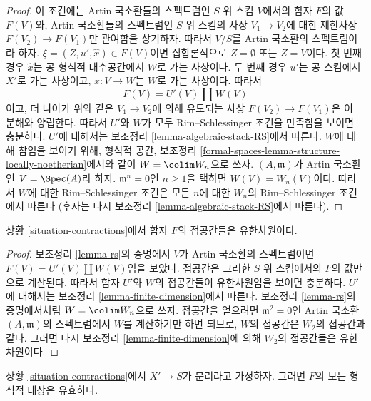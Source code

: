 \begin{proof}
이 조건에는 Artin 국소환들의 스펙트럼인 $S$ 위 스킴 $V$에서의
함자 $F$의 값 $F(V)$와, Artin 국소환들의 스펙트럼인 $S$ 위 스킴의
사상 $V_1 \to V_2$에 대한 제한사상 $F(V_2) \to F(V_1)$만 관여함을
상기하자. 따라서 $V/S$를 Artin 국소환의 스펙트럼이라 하자.
$\xi = (Z, u', \hat x) \in F(V)$이면 집합론적으로
$Z = \emptyset$ 또는 $Z = V$이다. 첫 번째 경우 $\hat x$는
공 형식적 대수공간에서 $W$로 가는 사상이다.
두 번째 경우 $u'$는 공 스킴에서 $X'$로 가는 사상이고,
$\hat x : V \to W$는 $W$로 가는 사상이다. 따라서
$$
F(V) = U'(V) \amalg W(V)
$$
이고, 더 나아가 위와 같은 $V_1 \to V_2$에 의해 유도되는 사상
$F(V_2) \to F(V_1)$은 이 분해와 양립한다.
따라서 $U'$와 $W$가 모두 Rim--Schlessinger 조건을 만족함을 보이면 충분하다.
$U'$에 대해서는 보조정리 \ref{lemma-algebraic-stack-RS}에서 따른다.
$W$에 대해 참임을 보이기 위해, 형식적 공간, 보조정리
\ref{formal-spaces-lemma-structure-locally-noetherian}에서와 같이
$W = \colim W_n$으로 쓰자.
$(A, \mathfrak m)$가 Artin 국소환인 $V = \Spec(A)$라 하자.
$\mathfrak m^n = 0$인 $n \geq 1$을 택하면 $W(V) = W_n(V)$이다.
따라서 $W$에 대한 Rim--Schlessinger 조건은 모든 $n$에 대한
$W_n$의 Rim--Schlessinger 조건에서 따른다
(후자는 다시 보조정리 \ref{lemma-algebraic-stack-RS}에서 따른다).
\end{proof}

\begin{lemma}
\label{lemma-finite-dim}
상황 \ref{situation-contractions}에서 함자 $F$의 접공간들은 유한차원이다.
\end{lemma}

\begin{proof}
보조정리 \ref{lemma-rs}의 증명에서 $V$가 Artin 국소환의 스펙트럼이면
$F(V) = U'(V) \amalg W(V)$임을 보았다. 접공간은 그러한 $S$ 위 스킴에서의
$F$의 값만으로 계산된다. 따라서 함자 $U'$와 $W$의 접공간들이
유한차원임을 보이면 충분하다. $U'$에 대해서는 보조정리
\ref{lemma-finite-dimension}에서 따른다.
보조정리 \ref{lemma-rs}의 증명에서처럼 $W = \colim W_n$으로 쓰자.
접공간을 얻으려면 $\mathfrak m^2 = 0$인 Artin 국소환
$(A, \mathfrak m)$의 스펙트럼에서 $W$를 계산하기만 하면 되므로,
$W$의 접공간은 $W_2$의 접공간과 같다.
그러면 다시 보조정리 \ref{lemma-finite-dimension}에 의해
$W_2$의 접공간들은 유한차원이다.
\end{proof}

\begin{lemma}
\label{lemma-formal-object-effective}
상황 \ref{situation-contractions}에서 $X' \to S$가 분리라고 가정하자.
그러면 $F$의 모든 형식적 대상은 유효하다.
\end{lemma}

